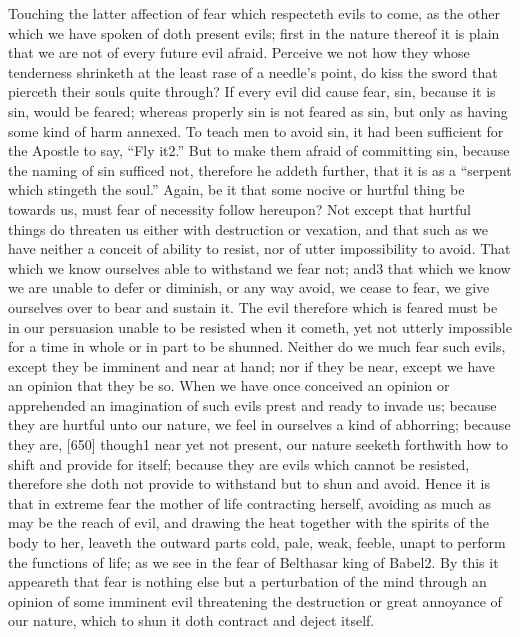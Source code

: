Touching the latter affection of fear which respecteth evils to come, as the other which we have spoken of doth present evils; first in the nature thereof it is plain that we are not of every future evil afraid. Perceive we not how they whose tenderness shrinketh at the least rase of a needle’s point, do kiss the sword that pierceth their souls quite through? If every evil did cause fear, sin, because it is sin, would be feared; whereas properly sin is not feared as sin, but only as having some kind of harm annexed. To teach men to avoid sin, it had been sufficient for the Apostle to say, “Fly it2.” But to make them afraid of committing sin, because the naming of sin sufficed not, therefore he addeth further, that it is as a “serpent which stingeth the soul.” Again, be it that some nocive or hurtful thing be towards us, must fear of necessity follow hereupon? Not except that hurtful things do threaten us either with destruction or vexation, and that such as we have neither a conceit of ability to resist, nor of utter impossibility to avoid. That which we know ourselves able to withstand we fear not; and3 that which we know we are unable to defer or diminish, or any way avoid, we cease to fear, we give ourselves over to bear and sustain it. The evil therefore which is feared must be in our persuasion unable to be resisted when it cometh, yet not utterly impossible for a time in whole or in part to be shunned. Neither do we much fear such evils, except they be imminent and near at hand; nor if they be near, except we have an opinion that they be so. When we have once conceived an opinion or apprehended an imagination of such evils prest and ready to invade us; because they are hurtful unto our nature, we feel in ourselves a kind of abhorring; because they are, [650] though1 near yet not present, our nature seeketh forthwith how to shift and provide for itself; because they are evils which cannot be resisted, therefore she doth not provide to withstand but to shun and avoid. Hence it is that in extreme fear the mother of life contracting herself, avoiding as much as may be the reach of evil, and drawing the heat together with the spirits of the body to her, leaveth the outward parts cold, pale, weak, feeble, unapt to perform the functions of life; as we see in the fear of Belthasar king of Babel2. By this it appeareth that fear is nothing else but a perturbation of the mind through an opinion of some imminent evil threatening the destruction or great annoyance of our nature, which to shun it doth contract and deject itself.

